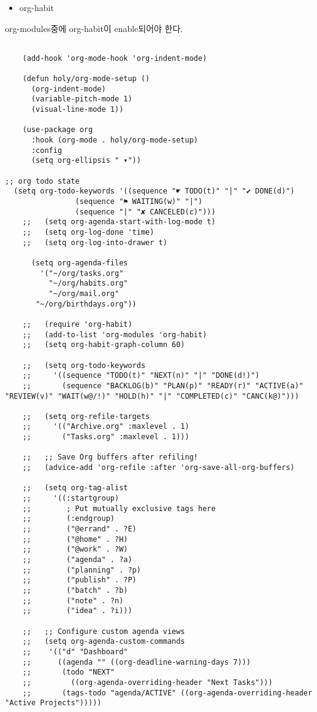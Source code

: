 \documentclass[11pt]{article}
\begin{document}
\begin{itemize}
\item org-habit
\end{itemize}
org-modules중에 org-habit이 enable되어야 한다.
\begin{verbatim}

    (add-hook 'org-mode-hook 'org-indent-mode)

    (defun holy/org-mode-setup ()
      (org-indent-mode)
      (variable-pitch-mode 1)
      (visual-line-mode 1))

    (use-package org
      :hook (org-mode . holy/org-mode-setup)
      :config
      (setq org-ellipsis " ▾"))

;; org todo state
  (setq org-todo-keywords '((sequence "☛ TODO(t)" "|" "✔ DONE(d)")
			    (sequence "⚑ WAITING(w)" "|")
			    (sequence "|" "✘ CANCELED(c)")))
    ;;   (setq org-agenda-start-with-log-mode t)
    ;;   (setq org-log-done 'time)
    ;;   (setq org-log-into-drawer t)

      (setq org-agenda-files
	    '("~/org/tasks.org"
	      "~/org/habits.org"
	      "~/org/mail.org"
	   "~/org/birthdays.org"))

    ;;   (require 'org-habit)
    ;;   (add-to-list 'org-modules 'org-habit)
    ;;   (setq org-habit-graph-column 60)

    ;;   (setq org-todo-keywords
    ;;     '((sequence "TODO(t)" "NEXT(n)" "|" "DONE(d!)")
    ;;       (sequence "BACKLOG(b)" "PLAN(p)" "READY(r)" "ACTIVE(a)" "REVIEW(v)" "WAIT(w@/!)" "HOLD(h)" "|" "COMPLETED(c)" "CANC(k@)")))

    ;;   (setq org-refile-targets
    ;;     '(("Archive.org" :maxlevel . 1)
    ;;       ("Tasks.org" :maxlevel . 1)))

    ;;   ;; Save Org buffers after refiling!
    ;;   (advice-add 'org-refile :after 'org-save-all-org-buffers)

    ;;   (setq org-tag-alist
    ;;     '((:startgroup)
    ;;        ; Put mutually exclusive tags here
    ;;        (:endgroup)
    ;;        ("@errand" . ?E)
    ;;        ("@home" . ?H)
    ;;        ("@work" . ?W)
    ;;        ("agenda" . ?a)
    ;;        ("planning" . ?p)
    ;;        ("publish" . ?P)
    ;;        ("batch" . ?b)
    ;;        ("note" . ?n)
    ;;        ("idea" . ?i)))

    ;;   ;; Configure custom agenda views
    ;;   (setq org-agenda-custom-commands
    ;;    '(("d" "Dashboard"
    ;;      ((agenda "" ((org-deadline-warning-days 7)))
    ;;       (todo "NEXT"
    ;;         ((org-agenda-overriding-header "Next Tasks")))
    ;;       (tags-todo "agenda/ACTIVE" ((org-agenda-overriding-header "Active Projects")))))


\end{verbatim}
\end{document}
